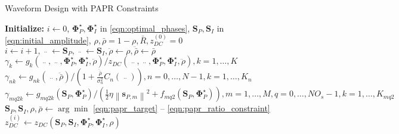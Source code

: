 \begin{algorithm}
  \caption{Waveform Design with PAPR Constraints}
  \label{alg:papr}
  \begin{algorithmic}[1]
    \State \textbf{Initialize:} $i \leftarrow 0$, ${\mathbf{\Phi }}_P^ \star ,{\mathbf{\Phi }}_I^ \star $ in \eqref{eqn:optimal_phases}, ${{{\mathbf{S}}_P},{{\mathbf{S}}_I}}$ in \eqref{eqn:initial_amplitude}, $\rho ,\bar \rho  = 1 - \rho ,\bar R,z_{DC}^{(0)} = 0$
    \Repeat
      \State $i \leftarrow i + 1,\mathop {{{\mathbf{S}}_P}}\limits^{..}  \leftarrow {{\mathbf{S}}_P},\mathop {{{\mathbf{S}}_P}}\limits^{..}  \leftarrow {{\mathbf{S}}_I},\ddot \rho  \leftarrow \rho ,\ddot \bar \rho  \leftarrow \bar \rho $
      \State ${\gamma _k} \leftarrow {g_k}\left( {\mathop {{{\mathbf{S}}_P}}\limits^{..} ,\mathop {{{\mathbf{S}}_I}}\limits^{..} ,{\mathbf{\Phi }}_P^ \star ,{\mathbf{\Phi }}_I^ \star ,\ddot \rho } \right)/{z_{DC}}\left( {\mathop {{{\mathbf{S}}_P}}\limits^{..} ,\mathop {{{\mathbf{S}}_I}}\limits^{..} ,{\mathbf{\Phi }}_P^ \star ,{\mathbf{\Phi }}_I^ \star ,\ddot \rho } \right),k = 1, \ldots ,K$
      \State ${\gamma _{nk}} \leftarrow {g_{nk}}\left( {\mathop {{{\mathbf{S}}_I}}\limits^{..} ,\ddot \bar \rho } \right)/\left( {1 + \frac{{\ddot \bar \rho }}{{\sigma _n^2}}{C_n}\left( {\mathop {{{\mathbf{S}}_I}}\limits^{..} } \right)} \right),n = 0, \ldots ,N - 1,k = 1, \ldots ,{K_n}$
      \State ${\gamma _{mq2k}} \leftarrow {g_{mq2k}}\left( {{{\mathbf{S}}_P},{\mathbf{\Phi }}_P^ \star } \right)/\left( {\frac{1}{2}\eta {{\left\| {{{\mathbf{s}}_{P,m}}} \right\|}^2} + {f_{mq2}}\left( {{{\mathbf{S}}_P},{\mathbf{\Phi }}_P^ \star } \right)} \right),m = 1, \ldots ,M,q = 0, \ldots ,N{O_s} - 1,k = 1, \ldots ,{K_{mq2}}$
      \State ${{\mathbf{S}}_P},{{\mathbf{S}}_I},\rho ,\bar \rho  \leftarrow \arg \min $ \eqref{eqn:papr_target} -- \eqref{eqn:papr_ratio_constraint}
      \State $z_{DC}^{(i)} \leftarrow {z_{DC}}\left( {{{\mathbf{S}}_P},{{\mathbf{S}}_I},{\mathbf{\Phi }}_P^ \star ,{\mathbf{\Phi }}_I^ \star ,\rho } \right)$
  \end{algorithmic}
\end{algorithm} 
